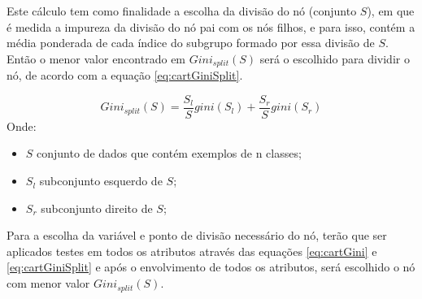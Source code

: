 Este cálculo tem como finalidade a escolha da divisão do nó (conjunto ${S}$), em que é medida a impureza da divisão do nó pai com os nós filhos, e para isso, contém a média ponderada de cada índice do subgrupo formado por essa divisão de ${S}$. Então o menor valor encontrado em ${Gini_{split}(S)}$ será o escolhido para dividir o nó, de acordo com a equação \ref{eq:cartGiniSplit}.

\begin{equation}
Gini_{split}(S) = \frac{S_l}{S}gini(S_l)+\frac{S_r}{S}gini(S_r)
 \label{eq:cartGiniSplit}
\end{equation}
Onde:
\begin{itemize}[noitemsep]
            \item ${S}$ conjunto de dados que contém exemplos de n classes;
            \item ${S_l}$ subconjunto esquerdo de ${S}$;
            \item ${S_r}$ subconjunto direito de ${S}$;
        \end{itemize}

Para a escolha da variável e ponto de divisão necessário do nó, terão que ser aplicados testes em todos os atributos através das equações \ref{eq:cartGini} e \ref{eq:cartGiniSplit} e após o envolvimento de todos os atributos, será escolhido o nó com menor valor ${Gini_{split}(S)}$.




